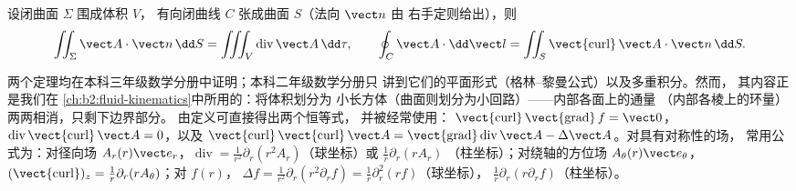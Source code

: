 \begin{theorem}[散度定理与斯托克斯定理]\label{thm:b2:maxwell-equations:theorems}
设闭曲面 $\Sigma$ 围成体积 $V$，
有向闭曲线 $C$ 张成曲面 $S$（法向 $\vect n$ 由
右手定则给出），则
\[
\iint_\Sigma\vect A\cdot\vect n\,\dd S = \iiint_V\operatorname{div}\vect A\,\dd\tau ,
\qquad
\oint_C\vect A\cdot\dd\vect l = \iint_S\operatorname{\vect{curl}}\vect A\cdot\vect n\,\dd S .
\]
\end{theorem}
\admitted

\begin{remark}[承认的内容及其可信之处]\label{rem:b2:maxwell-equations:whyadmitted}
两个定理均在本科三年级数学分册中证明；本科二年级数学分册只
讲到它们的平面形式（格林–黎曼公式）以及多重积分。然而，
其内容正是我们在
\cref{ch:b2:fluid-kinematics}中所用的：将体积划分为
小长方体（曲面则划分为小回路）——内部各面上的通量
（内部各棱上的环量）两两相消，只剩下边界部分。
由定义可直接得出两个恒等式，
并被经常使用：
$\operatorname{\vect{curl}}\operatorname{\vect{grad}}f = \vect 0$，
$\operatorname{div}\operatorname{\vect{curl}}\vect A = 0$，以及
$\operatorname{\vect{curl}}\operatorname{\vect{curl}}\vect A = \operatorname{\vect{grad}}
\operatorname{div}\vect A - \Delta\vect A$。对具有对称性的场，
常用公式为：对径向场 $A_r(r)\vect e_r$，$\operatorname{div}
= \frac1{r^2}\partial_r(r^2A_r)$（球坐标）或 $\frac1r\partial_r(rA_r)$
（柱坐标）；对绕轴的方位场 $A_\theta(r)\vect e_\theta$，
$(\operatorname{\vect{curl}})_z = \frac1r\partial_r(rA_\theta)$；对 $f(r)$，
$\Delta f = \frac1{r^2}\partial_r(r^2\partial_rf) = \frac1r\partial_r^2(rf)$（球坐标），
$\frac1r\partial_r(r\partial_rf)$（柱坐标）。
\end{remark}

